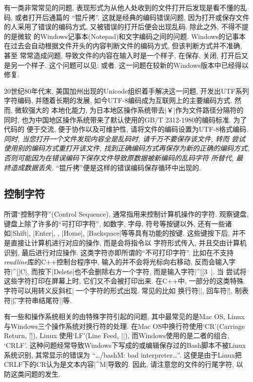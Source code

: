 有一类非常常见的问题, 表现形式为从他人处收到的文件打开后发现是看不懂的乱码, 或者打开后通篇的
``锟斤拷''. 这就是经典的编码错误问题, 因为打开或保存文件的人采用了错误的编码方式, 又被错误的打开后便会出现乱码. 除此之外, 不得不提的是微软
的Windows记事本(Notepad)和文字编码之间的问题. Windows的记事本在过去会自动根据文件开头的内容判断文件的编码方式, 但该判断方式并不准确, 甚至
常常造成问题, 导致文件的内容在输入时是一个样子, 在保存, 关闭, 打开后又是另一个样子. 这个问题可以见: 
或者.
这一问题在较新的Windows版本中已经得以修复.

20世纪80年代末, 美国加州出现的Unicode组织着手解决这一问题, 开发出UTF系列字符编码, 并随着长期的发展, 如今UTF-8编码成为互联网上的主要编码方式. 然而, 微软强大的
本地化能力, 为日本地区操作系统带去\cverb|￥|作为文件路径分隔符的同时, 也为中国地区操作系统带来了默认使用的GB/T 2312-1980的编码标准. 为了代码的
便于交流, 便于协作以及可维护性, 请将文件的编码设置为UTF-8格式编码. \emph{同时, 当您打开一个文件发现内容全是乱码时, 请千万不要保存该文件, 转而
尝试使用别的编码方式重打开该文件, 找到正确编码方式再保存为新的正确的编码方式, 否则可能因为在错误编码下保存文件导致原数据被新编码的乱码字符
所替代, 最终造成数据丢失.} ``锟斤拷''便是这样的错误编码保存循环中出现的.

\subsection{控制字符}
所谓``控制字符''(Control Sequence), 通常指用来控制计算机操作的字符. 观察键盘, 键盘上除了许多的``可打印字符'', 如数字, 字母, 符号等按键以外, 还有一些诸如\cverb|Shift|,
\cverb|Enter|, {\colorbox{cverbbg}{\textuparrow}}, \cverb|Home|, \cverb|Backspace|等等具有功能的按键. 这些键按下后, 并不是直接让计算机进行对应的操作, 而是会将指令以
字符形式传入, 并且交由计算机识别, 最后进行对应操作. 这类字符亦即所谓的``不可打印字符''. 比如在不支持\emph{readline}库的C++控制台程序中, 
输入的\colorbox{cverbbg}{\textrightarrow}并不会将光标向右移动, 反而会输入字符\cverb|^[[C|, 而按下\cverb|Delete|也不会删除右方一个字符, 而是输入字符\cverb|^[[3~|. 当
尝试将这些字符打印在屏幕上时, 它们又不会被打印出来. 在C++中, 一部分的这类特殊字符可以用转义反斜杠\cverb|\|加一个字符的形式出现. 常见的比如
换行符\cverb|\n|, 回车符\cverb|\r|, 制表符\cverb|\t|, 字符串结尾符\cverb|\0|等.

有一些和操作系统相关的由特殊字符引起的问题, 其中最常见的是Mac OS, Linux与Windows三个操作系统对换行符的处理. 在Mac OS中换行符使用`CR'(Carriage Return, \cverb|\r|), Linux
使用`LF'(Line Feed, \cverb|\n|), 而Windows使用的是二者的组合, `CRLF'. 这种问题经常导致Windows下写成的或编辑保存过的Bash脚本不被Linux系统识别, 其常显示的错误为
``\dots{}/bash\^M: bad interpreter\dots''. 
这便是由于Linux把CRLF下的CR认为是文本内容\cverb|^M|导致的. 因此, 请注意您的文件的行尾字符, 以防这类问题的发生.

